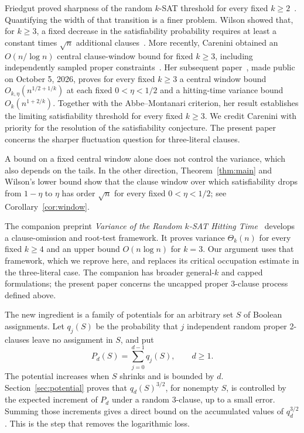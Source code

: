 \documentclass[11pt]{article}
\theoremstyle{remark}
\numberwithin{equation}{section}
\begin{document}
Friedgut proved sharpness of the random $k$-SAT threshold for every fixed
$k\ge2$~\cite[Theorem~1.3]{Friedgut1999}. Quantifying the width of that
transition is a finer problem. Wilson showed that, for $k\ge3$, a fixed
decrease in the satisfiability probability requires at least a constant
times $\sqrt n$ additional clauses~\cite{Wilson2002}. More recently,
Carenini obtained an $O(n/\log n)$ central clause-window bound for fixed
$k\ge3$, including independently sampled proper
constraints~\cite[Corollaries~7.10--7.11]{Carenini2026}.
Her subsequent paper~\cite[Theorems~1.1 and~1.3, Corollary~1.2]{Carenini2026Polynomial},
made public on October 5, 2026, proves for every fixed $k\ge3$ a central
window bound $O_{k,\eta}(n^{1/2+1/k})$ at each fixed $0<\eta<1/2$
and a hitting-time variance bound $O_k(n^{1+2/k})$.
Together with the Abbe--Montanari criterion, her result establishes the
limiting satisfiability threshold for every fixed $k\ge3$.
We credit Carenini with priority for the resolution of the satisfiability
conjecture. The present paper concerns the sharper fluctuation question
for three-literal clauses.

A bound on a fixed central window alone does not control the variance,
which also depends on the tails.
In the other direction, Theorem~\ref{thm:main} and Wilson's lower bound
show that the clause window over which satisfiability drops from
$1-\eta$ to $\eta$ has order $\sqrt n$ for every fixed $0<\eta<1/2$;
see Corollary~\ref{cor:window}.

The companion preprint \emph{Variance of the Random $k$-SAT Hitting
Time}~\cite{OpenAI2026Variance} develops a clause-omission and root-test
framework. It proves variance $\Theta_k(n)$ for every fixed $k\ge4$
and an upper bound $O(n\log n)$ for $k=3$. Our argument uses that
framework, which we reprove here, and replaces its critical occupation
estimate in the three-literal case. The companion has broader general-$k$
and capped formulations; the present paper concerns the uncapped proper
3-clause process defined above.

The new ingredient is a family of potentials for an arbitrary set $S$ of
Boolean assignments. Let $q_j(S)$ be the probability that $j$ independent
random proper 2-clauses leave no assignment in $S$, and put
\[
 P_d(S)=\sum_{j=0}^{d-1}q_j(S),\qquad d\ge1.
\]
The potential increases when $S$ shrinks and is bounded by $d$.
Section~\ref{sec:potential} proves that $q_d(S)^{3/2}$, for nonempty $S$,
is controlled by the expected increment of $P_d$ under a random
3-clause, up to a small error. Summing those increments gives a direct
bound on the accumulated values of $q_d^{3/2}$. This is the step that
removes the logarithmic loss.
\end{document}
